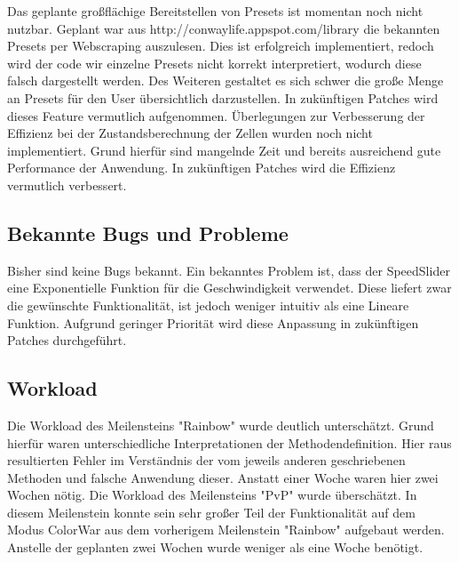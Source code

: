 \documentclass[12pt]{article}
\theoremstyle{plain}
\begin{document}
\begin{linenumbers}
\newline
Das geplante großflächige Bereitstellen von Presets ist momentan noch nicht nutzbar. Geplant war aus http://conwaylife.appspot.com/library die bekannten Presets per Webscraping auszulesen. Dies ist erfolgreich implementiert, redoch wird der code wir einzelne Presets nicht korrekt interpretiert, wodurch diese falsch dargestellt werden.  Des Weiteren gestaltet es sich schwer die große Menge an Presets für den User übersichtlich darzustellen. In zukünftigen Patches wird dieses Feature vermutlich aufgenommen.
\newline
Überlegungen zur Verbesserung der Effizienz bei der Zustandsberechnung der Zellen wurden noch nicht implementiert. Grund hierfür sind mangelnde Zeit und bereits ausreichend gute Performance der Anwendung. In zukünftigen Patches wird die Effizienz vermutlich verbessert.

\subsection{Bekannte Bugs und Probleme}
Bisher sind keine Bugs bekannt. 
\newline
Ein bekanntes Problem ist, dass der SpeedSlider eine Exponentielle Funktion für die Geschwindigkeit verwendet. Diese liefert zwar die gewünschte Funktionalität, ist jedoch weniger intuitiv als eine Lineare Funktion. Aufgrund geringer Priorität wird diese Anpassung in zukünftigen Patches durchgeführt.
\subsection{Workload}
Die Workload des Meilensteins "Rainbow" wurde deutlich unterschätzt. Grund hierfür waren unterschiedliche Interpretationen der Methodendefinition. Hier raus resultierten Fehler im Verständnis der vom jeweils anderen geschriebenen Methoden und falsche Anwendung dieser. Anstatt einer Woche waren hier zwei Wochen nötig.
\newline
Die Workload des Meilensteins "PvP" wurde überschätzt. In diesem Meilenstein konnte sein sehr großer Teil der Funktionalität auf dem Modus ColorWar aus dem vorherigem Meilenstein "Rainbow" aufgebaut werden. Anstelle der geplanten zwei Wochen wurde weniger als eine Woche benötigt.

\end{linenumbers}
\end{document}
